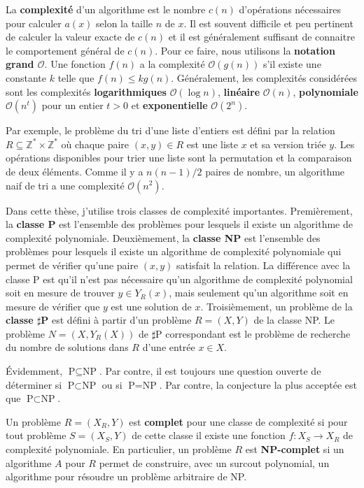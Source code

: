La \textbf{complexité} d'un algorithme est le nombre $c(n)$ d'opérations nécessaires
pour calculer $a(x)$ selon la taille $n$ de $x$.
Il est souvent difficile et peu pertinent de calculer la valeur exacte de $c(n)$
et il est généralement suffisant de connaitre le comportement général de $c(n)$.
Pour ce faire,
nous utilisons la \textbf{notation grand $\mathcal O$}.
Une fonction $f(n)$ a la complexité $\mathcal O(g(n))$ s'il existe
une constante $k$ telle que $f(n) \leq k g(n)$.
Généralement,
les complexités considérées sont les complexités \textbf{logarithmiques} $\mathcal O(\log n)$,
\textbf{linéaire} $\mathcal O(n)$,
\textbf{polynomiale} $\mathcal O(n^t)$ pour un entier $t > 0$
et \textbf{exponentielle} $\mathcal O(2^n)$.

Par exemple,
le problème du tri d'une liste d'entiers est défini par la relation
$R \subseteq \mathbb Z^* \times \mathbb Z^*$
où chaque paire $(x, y) \in R$ est une liste $x$ et sa version triée $y$.
Les opérations disponibles pour trier une liste sont la permutation et
la comparaison de deux éléments.
Comme il y a $n(n-1)/2$ paires de nombre,
un algorithme naif de tri a une complexité $\mathcal O(n^2)$.

Dans cette thèse,
j'utilise trois classes de complexité importantes.
Premièrement,
la \textbf{classe P} est l'ensemble des problèmes
pour lesquels il existe un algorithme de complexité polynomiale.
Deuxièmement,
la \textbf{classe NP} est l'ensemble des problèmes
pour lesquels il existe un algorithme de complexité polynomiale
qui permet de vérifier qu'une paire $(x, y)$ satisfait la relation.
La différence avec la classe P est qu'il n'est pas nécessaire qu'un 
algorithme de complexité polynomial soit en mesure de trouver $y \in Y_R(x)$,
mais seulement qu'un algorithme soit en mesure de vérifier que $y$ est une solution
de $x$.
Troisièmement,
un problème de la \textbf{classe $\sharp$P} est défini à partir d'un problème
$R = (X, Y)$ de la classe NP.
Le problème $N = (X, Y_R(X))$ de $\sharp$P correspondant est le problème de
recherche du nombre de solutions dans $R$ d'une entrée $x \in X$.

Évidemment, $\text{P} \subseteq \text{NP}$.
Par contre, 
il est toujours une question ouverte de déterminer si
$\text{P} \subset \text{NP}$ ou si $\text{P} = \text{NP}$.
Par contre,
la conjecture la plus acceptée est que $\text{P} \subset \text{NP}$.

Un problème $R = (X_R, Y)$ est \textbf{complet} pour une classe de complexité
si pour tout problème $S = (X_S, Y)$ de cette classe il existe une fonction 
$f: X_S \to X_R$ de complexité polynomiale.
En particulier,
un problème $R$ est \textbf{NP-complet} si un algorithme $A$ pour $R$
permet de construire, avec un surcout polynomial,
un algorithme pour résoudre un problème arbitraire de NP.

